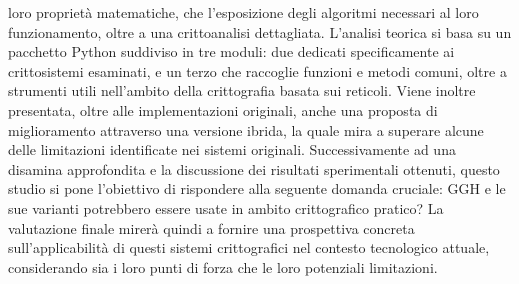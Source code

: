 \documentclass[a4paper,12pt]{article}
\begin{document}
loro proprietà matematiche, che l'esposizione degli algoritmi necessari al loro funzionamento, 
oltre a una crittoanalisi dettagliata. 
L'analisi teorica si basa su un pacchetto Python suddiviso in tre moduli: due dedicati specificamente ai crittosistemi esaminati, e un 
terzo che raccoglie funzioni e metodi comuni, oltre a strumenti utili nell'ambito della 
crittografia basata sui reticoli. Viene inoltre presentata, oltre alle implementazioni originali, 
anche una proposta di miglioramento attraverso una versione ibrida, la quale
mira a superare alcune delle limitazioni identificate nei sistemi originali. 
Successivamente ad una disamina approfondita e la discussione dei risultati sperimentali ottenuti,
questo studio si pone l'obiettivo di rispondere alla seguente domanda cruciale: GGH e le sue varianti 
potrebbero essere usate in ambito crittografico pratico? La valutazione finale mirerà quindi a 
fornire una prospettiva concreta sull'applicabilità di questi sistemi crittografici 
nel contesto tecnologico attuale, considerando sia i loro punti di forza che le loro 
potenziali limitazioni.
\end{document}

